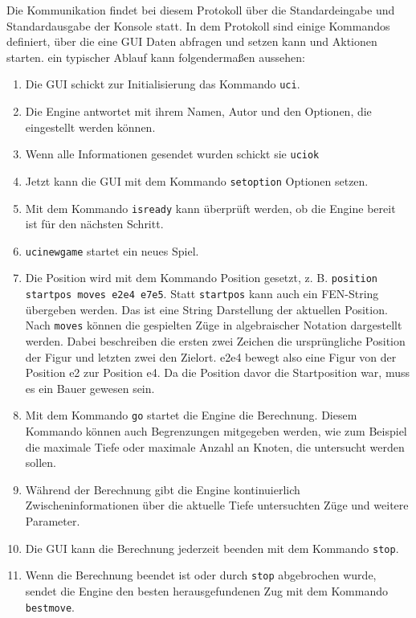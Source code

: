 Die Kommunikation findet bei diesem Protokoll über die Standardeingabe und Standardausgabe der Konsole statt. In dem Protokoll sind einige Kommandos definiert, über die eine GUI Daten abfragen und setzen kann und Aktionen starten. ein typischer Ablauf kann folgendermaßen aussehen:
\begin{enumerate}
    \item Die GUI schickt zur Initialisierung das Kommando \lstinline{uci}.
    \item Die Engine antwortet mit ihrem Namen, Autor und den Optionen, die eingestellt werden können.
    \item Wenn alle Informationen gesendet wurden schickt sie \lstinline{uciok}
    \item Jetzt kann die GUI mit dem Kommando \lstinline{setoption} Optionen setzen.
    \item Mit dem Kommando \lstinline{isready} kann überprüft werden, ob die Engine bereit ist für den nächsten Schritt.
    \item \lstinline{ucinewgame} startet ein neues Spiel.
    \item Die Position wird mit dem Kommando Position gesetzt, z. B. \lstinline{position startpos moves e2e4 e7e5}. Statt \lstinline{startpos} kann auch ein FEN-String übergeben werden. Das ist eine String Darstellung der aktuellen Position. Nach \lstinline{moves} können die gespielten Züge in algebraischer Notation dargestellt werden. Dabei beschreiben die ersten zwei Zeichen die ursprüngliche Position der Figur und letzten zwei den Zielort. e2e4 bewegt also eine Figur von der Position e2 zur Position e4. Da die Position davor die Startposition war, muss es ein Bauer gewesen sein.
    \item Mit dem Kommando \lstinline{go} startet die Engine die Berechnung. Diesem Kommando können auch Begrenzungen mitgegeben werden, wie zum Beispiel die maximale Tiefe oder maximale Anzahl an Knoten, die untersucht werden sollen.
    \item Während der Berechnung gibt die Engine kontinuierlich Zwischeninformationen über die aktuelle Tiefe untersuchten Züge und weitere Parameter.
    \item Die GUI kann die Berechnung jederzeit beenden mit dem Kommando \lstinline{stop}.
    \item Wenn die Berechnung beendet ist oder durch \lstinline{stop} abgebrochen wurde, sendet die Engine den besten herausgefundenen Zug mit dem Kommando \lstinline{bestmove}.
\end{enumerate}
\cite{stefan_meyer-kahlen_universal_2025}

